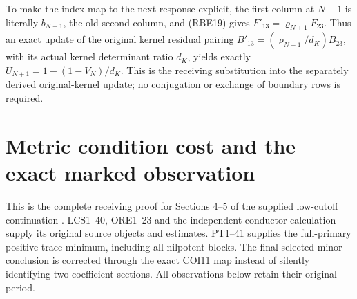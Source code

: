 \documentclass[11pt,a4paper]{article}
\providecommand{\Tr}{\operatorname{Tr}}
\providecommand{\norm}[1]{\left\lVert#1\right\rVert}
\begin{document}
To make the index map to the next response explicit, the first
column at \(N+1\) is literally \(b_{N+1}\), the old second
column, and (RBE19) gives \(F'_{13}=\varrho_{N+1}F_{23}\).
Thus an exact update of the original kernel residual pairing
\(B'_{13}=(\varrho_{N+1}/d_K)B_{23}\), with its actual
kernel determinant ratio \(d_K\), yields exactly
\(U_{N+1}=1-(1-V_N)/d_K\). This is the receiving substitution
into the separately derived original-kernel update; no conjugation
or exchange of boundary rows is required.



\endgroup

\clearpage
\begingroup
\def\C{\mathbb C}
\def\Tr{\operatorname{Tr}}
\def\im{\operatorname{im}}
\def\cond{\operatorname{cond}}
\def\lc{\operatorname{lc}}
\def\norm#1{\left\lVert#1\right\rVert}

\setcounter{equation}{0}
\renewcommand{\theequation}{A04CMO.\arabic{equation}}
\section*{Metric condition cost and the exact marked observation}


This is the complete receiving proof for Sections 4--5 of the
supplied low-cutoff continuation \cite{a04cmo:source}. LCS1--40, ORE1--23 and the
independent conductor calculation supply its original source
objects and estimates. PT1--41 \cite{a04cmo:PT} supplies the full-primary
positive-trace minimum, including all nilpotent blocks.
The final selected-minor conclusion is corrected through the
exact COI11 map \cite{a04cmo:COI} instead of silently identifying two coefficient
sections. All observations below retain their original period.
\end{document}
